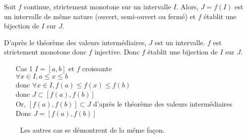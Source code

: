 \begin{thm}

	Soit $f$ continue, strictement monotone sur un intervalle $I$.
	Alors, $J = f(I)$ est un intervalle de même nature (ouvert, semi-ouvert ou fermé) et $f$ établit une bijection de $I$ sur $J$.
\end{thm}

\begin{prv}
	D'après le théorème des valeurs intermédiaires, $J$ est un intervalle.
	$f$ est strictement monotone donc $f$ injective.
	Donc $f$ établit une bijection de $I$ sur $J$.\\

	\begin{itemize}
		\item[\sc Cas 1] $I = [a,b]$ et $f$ croissante\\
			$\forall x \in I, a \le x \le b$\\
			donc  $\forall x \in I, f(a) \le f(x) \le f(b)$ \\
			donc $J \subset [f(a), f(b)]$\\
			Or, $[f(a), f(b)] \subset J$ d'après le théorème des valeurs intermédiaires\\
			Donc $J = [f(a), f(b)]$
	\end{itemize}
	~~~~ Les autres cas se démontrent de la même façon.
\end{prv}

